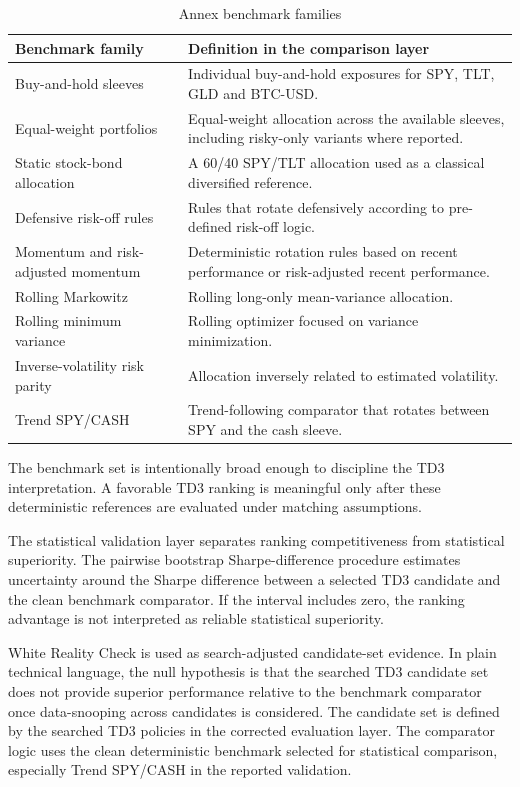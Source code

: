 \documentclass[12pt]{article}
\begin{document}
\begin{table}[H]
\centering
\caption{Annex benchmark families}
\scriptsize
\begin{tabularx}{\textwidth}{L{0.28\textwidth}Y}
\toprule
\textbf{Benchmark family} & \textbf{Definition in the comparison layer} \\
\midrule
Buy-and-hold sleeves & Individual buy-and-hold exposures for SPY, TLT, GLD and BTC-USD. \\
Equal-weight portfolios & Equal-weight allocation across the available sleeves, including risky-only variants where reported. \\
Static stock-bond allocation & A 60/40 SPY/TLT allocation used as a classical diversified reference. \\
Defensive risk-off rules & Rules that rotate defensively according to pre-defined risk-off logic. \\
Momentum and risk-adjusted momentum & Deterministic rotation rules based on recent performance or risk-adjusted recent performance. \\
Rolling Markowitz & Rolling long-only mean-variance allocation. \\
Rolling minimum variance & Rolling optimizer focused on variance minimization. \\
Inverse-volatility risk parity & Allocation inversely related to estimated volatility. \\
Trend SPY/CASH & Trend-following comparator that rotates between SPY and the cash sleeve. \\
\bottomrule
\end{tabularx}
\end{table}

The benchmark set is intentionally broad enough to discipline the TD3 interpretation. A favorable TD3 ranking is meaningful only after these deterministic references are evaluated under matching assumptions.


The statistical validation layer separates ranking competitiveness from statistical superiority. The pairwise bootstrap Sharpe-difference procedure estimates uncertainty around the Sharpe difference between a selected TD3 candidate and the clean benchmark comparator. If the interval includes zero, the ranking advantage is not interpreted as reliable statistical superiority.

White Reality Check is used as search-adjusted candidate-set evidence. In plain technical language, the null hypothesis is that the searched TD3 candidate set does not provide superior performance relative to the benchmark comparator once data-snooping across candidates is considered. The candidate set is defined by the searched TD3 policies in the corrected evaluation layer. The comparator logic uses the clean deterministic benchmark selected for statistical comparison, especially Trend SPY/CASH in the reported validation.
\end{document}
